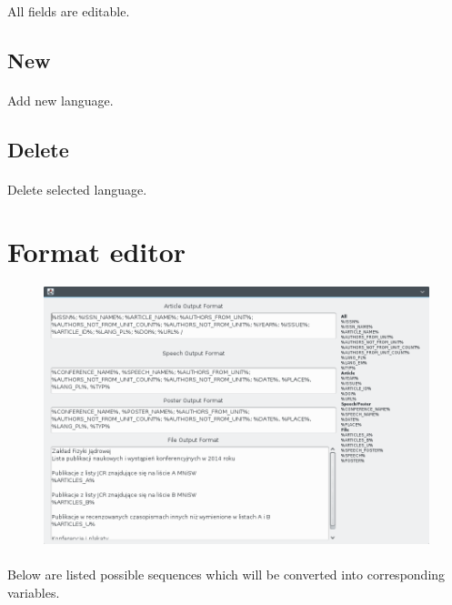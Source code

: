 \documentclass[a4paper,10pt]{article}
\begin{document}
\paragraph{}All fields are editable.
\subsection{New}
\paragraph{}Add new language.
\subsection{Delete}
\paragraph{}Delete selected language.

\section{Format editor}
\begin{figure}[H]
 \centering
 \includegraphics[width=35em]{kpub-format.png}
\end{figure}
\paragraph{}Below are listed possible sequences which will be converted into corresponding variables.
\end{document}

